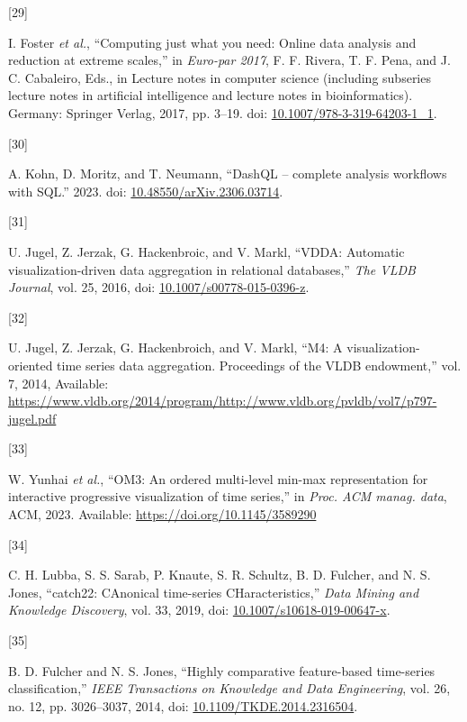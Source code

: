 \documentclass{article}
\newlength{\cslhangindent}
\newlength{\csllabelwidth}
\newlength{\cslentryspacingunit} %
\newenvironment{CSLReferences}[2] %
 {%
  \setlength{\parindent}{0pt}
  \ifodd #1
  \let\oldpar\par
  \def\par{\hangindent=\cslhangindent\oldpar}
  \fi
  \setlength{\parskip}{#2\cslentryspacingunit}
 }%
 {}
\newcommand{\CSLLeftMargin}[1]{\parbox[t]{\csllabelwidth}{#1}}
\newcommand{\CSLRightInline}[1]{\parbox[t]{\linewidth - \csllabelwidth}{#1}\break}
\begin{document}
\begin{CSLReferences}{0}{0}
\leavevmode{}%
\CSLLeftMargin{{[}29{]} }%
\CSLRightInline{I. Foster \emph{et al.}, {``Computing just what you
need: Online data analysis and reduction at extreme scales,''} in
\emph{Euro-par 2017}, F. F. Rivera, T. F. Pena, and J. C. Cabaleiro,
Eds., in Lecture notes in computer science (including subseries lecture
notes in artificial intelligence and lecture notes in bioinformatics).
Germany: Springer Verlag, 2017, pp. 3--19. doi:
\href{https://doi.org/10.1007/978-3-319-64203-1_1}{10.1007/978-3-319-64203-1\_1}.}

\leavevmode{}%
\CSLLeftMargin{{[}30{]} }%
\CSLRightInline{A. Kohn, D. Moritz, and T. Neumann, {``DashQL --
complete analysis workflows with SQL.''} 2023. doi:
\href{https://doi.org/10.48550/arXiv.2306.03714}{10.48550/arXiv.2306.03714}.}

\leavevmode{}%
\CSLLeftMargin{{[}31{]} }%
\CSLRightInline{U. Jugel, Z. Jerzak, G. Hackenbroic, and V. Markl,
{``VDDA: Automatic visualization-driven data aggregation in relational
databases,''} \emph{The VLDB Journal}, vol. 25, 2016, doi:
\href{https://doi.org/10.1007/s00778-015-0396-z}{10.1007/s00778-015-0396-z}.}

\leavevmode{}%
\CSLLeftMargin{{[}32{]} }%
\CSLRightInline{U. Jugel, Z. Jerzak, G. Hackenbroich, and V. Markl,
{``M4: A visualization-oriented time series data aggregation.
Proceedings of the VLDB endowment,''} vol. 7, 2014, Available:
\url{https://www.vldb.org/2014/program/http://www.vldb.org/pvldb/vol7/p797-jugel.pdf}}

\leavevmode{}%
\CSLLeftMargin{{[}33{]} }%
\CSLRightInline{W. Yunhai \emph{et al.}, {``OM3: An ordered multi-level
min-max representation for interactive progressive visualization of time
series,''} in \emph{Proc. ACM manag. data}, ACM, 2023. Available:
\url{https://doi.org/10.1145/3589290}}

\leavevmode{}%
\CSLLeftMargin{{[}34{]} }%
\CSLRightInline{C. H. Lubba, S. S. Sarab, P. Knaute, S. R. Schultz, B.
D. Fulcher, and N. S. Jones, {``catch22: CAnonical time-series
CHaracteristics,''} \emph{Data Mining and Knowledge Discovery}, vol. 33,
2019, doi:
\href{https://doi.org/10.1007/s10618-019-00647-x}{10.1007/s10618-019-00647-x}.}

\leavevmode{}%
\CSLLeftMargin{{[}35{]} }%
\CSLRightInline{B. D. Fulcher and N. S. Jones, {``Highly comparative
feature-based time-series classification,''} \emph{IEEE Transactions on
Knowledge and Data Engineering}, vol. 26, no. 12, pp. 3026--3037, 2014,
doi:
\href{https://doi.org/10.1109/TKDE.2014.2316504}{10.1109/TKDE.2014.2316504}.}


\end{CSLReferences}
\end{document}
